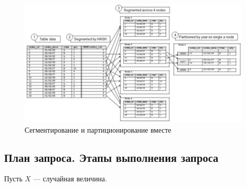 \begin{figure}[h]
	\centering
	\includegraphics[width=18cm, keepaspectratio]{assets/segm.png}
	\caption{Сегментирование и партиционирование вместе} 
\end{figure}



\subsection{План запроса. Этапы выполнения запроса}

Пусть $X$ --- случайная величина.
